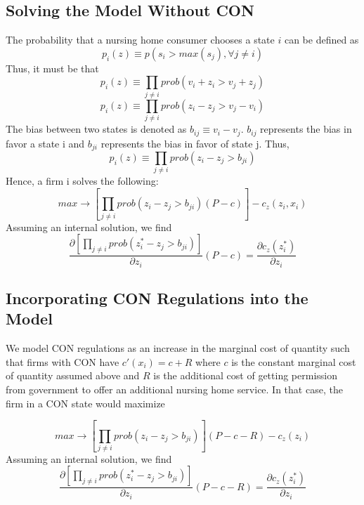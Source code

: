 \documentclass[../Main.tex]{subfiles}
\begin{document}
\subsection{Solving the Model Without CON}
The probability that a nursing home consumer chooses a state $i$ can be defined as \begin{equation}p_i(z) \equiv p(s_i> max(s_j), \forall j \neq i )\end{equation}
Thus, it must be that \begin{equation}p_i(z) \equiv \prod_{j\neq i} prob(v_i + z_i > v_j + z_j) \end{equation} 
 \begin{equation}p_i(z) \equiv \prod_{j\neq i} prob(z_i-z_j > v_j - v_i) \end{equation} 
The bias between two states is denoted as $b_{ij} \equiv v_i -v_j $. $b_{ij}$ represents the bias in favor a state i and $b_{ji}$ represents the bias in favor of state j. Thus,\begin{equation}p_i(z) \equiv \prod_{j\neq i} prob(z_i -z_j > b_{ji}) \end{equation}  
Hence, a firm i solves the following:\begin{equation}max \rightarrow [\prod_{j\neq i} prob(z_i -z_j > b_{ji})(P-c)] - c_z(z_i,x_i)\end{equation}
Assuming an internal solution, we find 
 \begin{equation}\frac{\partial [\prod_{j\neq i} prob(z_i^* -z_j > b_{ji})]}{\partial z_i}(P-c) = \frac{\partial c_z(z_i^*)}{\partial z_i}\end{equation}

\subsection{Incorporating CON Regulations into the Model}

We model CON regulations as an increase in the marginal cost of quantity such that firms with CON have $c'(x_i) = c + R$ where $c$ is the constant marginal cost of quantity assumed above and $R$ is the additional cost of getting permission from government to offer an additional nursing home service. In that case, the firm in a CON state would maximize

\begin{equation} max \rightarrow [\prod_{j\neq i} prob(z_i -z_j > b_{ji})](P-c - R) - c_z(z_i) \end{equation}
Assuming an internal solution, we find 
 \begin{equation}\frac{\partial [\prod_{j\neq i} prob(z_i^* -z_j > b_{ji})]}{\partial z_i}(P-c-R) = \frac{\partial c_z(z_i^*)}{\partial z_i}\end{equation}
\end{document}
